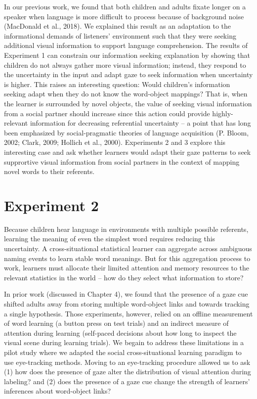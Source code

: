 \documentclass[man,floatsintext]{apa6}
\begin{document}
In our previous work, we found that both children and adults fixate
longer on a speaker when language is more difficult to process because
of background noise (MacDonald et al., 2018). We explained this result
as an adaptation to the informational demands of listeners' environment
such that they were seeking additional visual information to support
language comprehension. The results of Experiment 1 can constrain our
information seeking explanation by showing that children do not always
gather more visual information; instead, they respond to the uncertainty
in the input and adapt gaze to seek information when uncertainty is
higher. This raises an interesting question: Would children's
information seeking adapt when they do not know the word-object
mappings? That is, when the learner is surrounded by novel objects, the
value of seeking visual information from a social partner should
increase since this action could provide highly-relevant information for
decreasing referential uncertainty -- a point that has long been
emphasized by social-pragmatic theories of language acquisition (P.
Bloom, 2002; Clark, 2009; Hollich et al., 2000). Experiments 2 and 3
explore this interesting case and ask whether learners would adapt their
gaze patterns to seek supprortive visual information from social
partners in the context of mapping novel words to their referents.

\section{Experiment 2}\label{experiment-2}

Because children hear language in environments with multiple possible
referents, learning the meaning of even the simplest word requires
reducing this uncertainty. A cross-situational statistical learner can
aggregate across ambiguous naming events to learn stable word meanings.
But for this aggregation process to work, learners must allocate their
limited attention and memory resources to the relevant statistics in the
world -- how do they select what information to store?

In prior work (discussed in Chapter 4), we found that the presence of a
gaze cue shifted adults away from storing multiple word-object links and
towards tracking a single hypothesis. Those experiments, however, relied
on an offline measurement of word learning (a button press on test
trials) and an indirect measure of attention during learning (self-paced
decisions about how long to inspect the visual scene during learning
trials). We begain to address these limitations in a pilot study where
we adapted the social cross-situational learning paradigm to use
eye-tracking methods. Moving to an eye-tracking procedure allowed us to
ask (1) how does the presence of gaze alter the distribution of visual
attention during labeling? and (2) does the presence of a gaze cue
change the strength of learners' inferences about word-object links?
\end{document}

